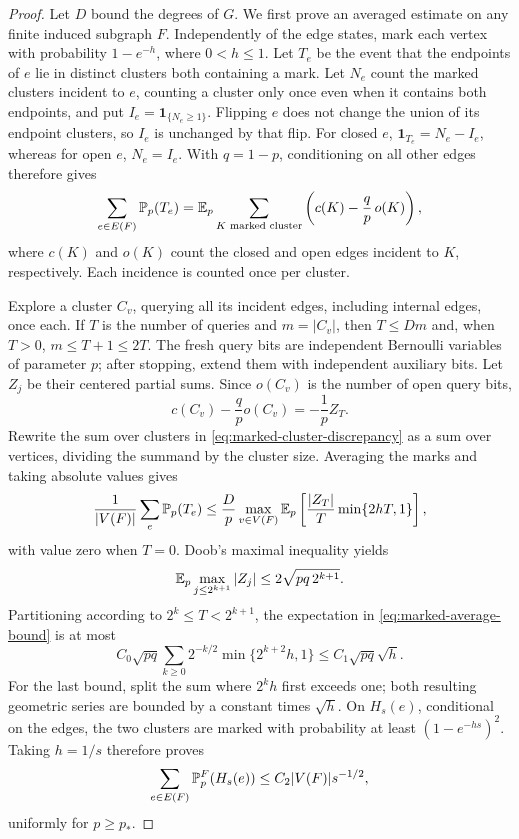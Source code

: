 \begin{proof}
Let $D$ bound the degrees of $G$. We first prove an averaged estimate
on any finite induced subgraph $F$. Independently of the edge states,
mark each vertex with probability $1-e^{-h}$, where $0<h\le1$.
Let $T_e$ be the event that the endpoints of $e$ lie in distinct clusters
both containing a mark. Let $N_e$ count the marked clusters incident
to $e$, counting a cluster only once even when it contains both endpoints,
and put $I_e=\mathbf1_{\{N_e\ge1\}}$. Flipping $e$ does not change the
union of its endpoint clusters, so $I_e$ is unchanged by that flip.
For closed $e$, $\mathbf1_{T_e}=N_e-I_e$, whereas for open $e$,
$N_e=I_e$. With $q=1-p$, conditioning on all other edges therefore gives
\begin{equation}\label{eq:marked-cluster-discrepancy}
 \sum_{e\in E(F)}\mathbb P_p(T_e)
 =\mathbb E_p\sum_{K\text{ marked cluster}}
 \left(c(K)-\frac qp\,o(K)\right),
\end{equation}
where $c(K)$ and $o(K)$ count the closed and open edges incident to $K$,
respectively. Each incidence is counted once per cluster.

Explore a cluster $C_v$, querying all its incident edges, including
internal edges, once each. If $T$ is the number of queries and
$m=|C_v|$, then $T\le Dm$ and, when $T>0$, $m\le T+1\le2T$.
The fresh query bits are independent Bernoulli variables of parameter
$p$; after stopping, extend them with independent auxiliary bits.
Let $Z_j$ be their centered partial sums. Since
$o(C_v)$ is the number of open query bits,
\[
 c(C_v)-\frac qp o(C_v)=-\frac1p Z_T.
\]
Rewrite the sum over clusters in
\eqref{eq:marked-cluster-discrepancy} as a sum over vertices, dividing
the summand by the cluster size. Averaging the marks and taking absolute
values gives
\begin{equation}\label{eq:marked-average-bound}
 \frac1{|V(F)|}\sum_e\mathbb P_p(T_e)
 \le\frac Dp\max_{v\in V(F)}
 \mathbb E_p\left[\frac{|Z_T|}{T}\min\{2hT,1\}\right],
\end{equation}
with value zero when $T=0$.
Doob's maximal inequality yields
\[
 \mathbb E_p\max_{j\le 2^{k+1}}|Z_j|
 \le2\sqrt{pq\,2^{k+1}}.
\]
Partitioning according to $2^k\le T<2^{k+1}$, the expectation in
\eqref{eq:marked-average-bound} is at most
\[
 C_0\sqrt{pq}\sum_{k\ge0}2^{-k/2}
                       \min\{2^{k+2}h,1\}
 \le C_1\sqrt{pq}\sqrt h.
\]
For the last bound, split the sum where $2^kh$ first exceeds one;
both resulting geometric series are bounded by a constant times
$\sqrt h$. On $H_s(e)$, conditional on the edges, the two clusters
are marked with probability at least $(1-e^{-hs})^2$. Taking $h=1/s$
therefore proves
\begin{equation}\label{eq:finite-two-cluster-average}
 \sum_{e\in E(F)}\mathbb P_p^F(H_s(e))
 \le C_2|V(F)|s^{-1/2},
\end{equation}
uniformly for $p\ge p_*$.


\end{proof}
